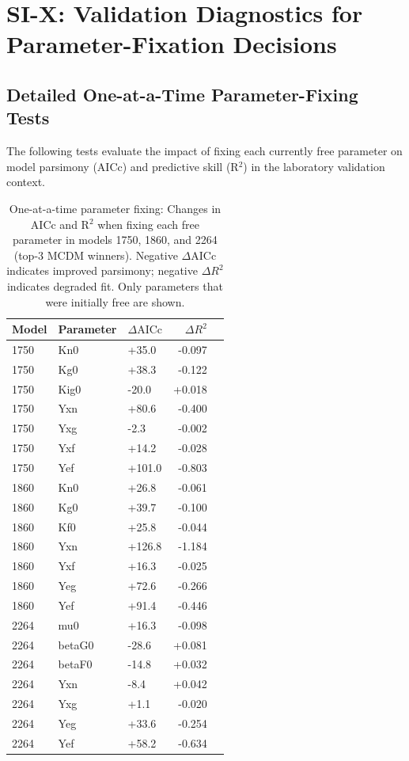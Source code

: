 
\section*{SI-X: Validation Diagnostics for Parameter-Fixation Decisions}

\subsection*{Detailed One-at-a-Time Parameter-Fixing Tests}

The following tests evaluate the impact of fixing each currently free parameter on model parsimony (AICc) 
and predictive skill (R$^2$) in the laboratory validation context.

\begin{table}[H]\centering
\small
\caption{One-at-a-time parameter fixing: Changes in AICc and R$^2$ when fixing each free parameter 
in models 1750, 1860, and 2264 (top-3 MCDM winners). Negative $\Delta\mathrm{AICc}$ indicates improved parsimony; negative 
$\Delta R^2$ indicates degraded fit. Only parameters that were initially free are shown.}
\label{tab:SI_X_1_ablation}
\begin{tabular}{lllrr}
\toprule
\textbf{Model} & \textbf{Parameter} & \textbf{$\Delta\mathrm{AICc}$} & \textbf{$\Delta R^2$} \\
\midrule
1750 & Kn0 &    +35.0 &   -0.097 \\
1750 & Kg0 &    +38.3 &   -0.122 \\
1750 & Kig0 &    -20.0 &   +0.018 \\
1750 & Yxn &    +80.6 &   -0.400 \\
1750 & Yxg &     -2.3 &   -0.002 \\
1750 & Yxf &    +14.2 &   -0.028 \\
1750 & Yef &   +101.0 &   -0.803 \\
1860 & Kn0 &    +26.8 &   -0.061 \\
1860 & Kg0 &    +39.7 &   -0.100 \\
1860 & Kf0 &    +25.8 &   -0.044 \\
1860 & Yxn &   +126.8 &   -1.184 \\
1860 & Yxf &    +16.3 &   -0.025 \\
1860 & Yeg &    +72.6 &   -0.266 \\
1860 & Yef &    +91.4 &   -0.446 \\
2264 & mu0 &    +16.3 &   -0.098 \\
2264 & betaG0 &    -28.6 &   +0.081 \\
2264 & betaF0 &    -14.8 &   +0.032 \\
2264 & Yxn &     -8.4 &   +0.042 \\
2264 & Yxg &     +1.1 &   -0.020 \\
2264 & Yeg &    +33.6 &   -0.254 \\
2264 & Yef &    +58.2 &   -0.634 \\
\bottomrule
\end{tabular}
\end{table}

